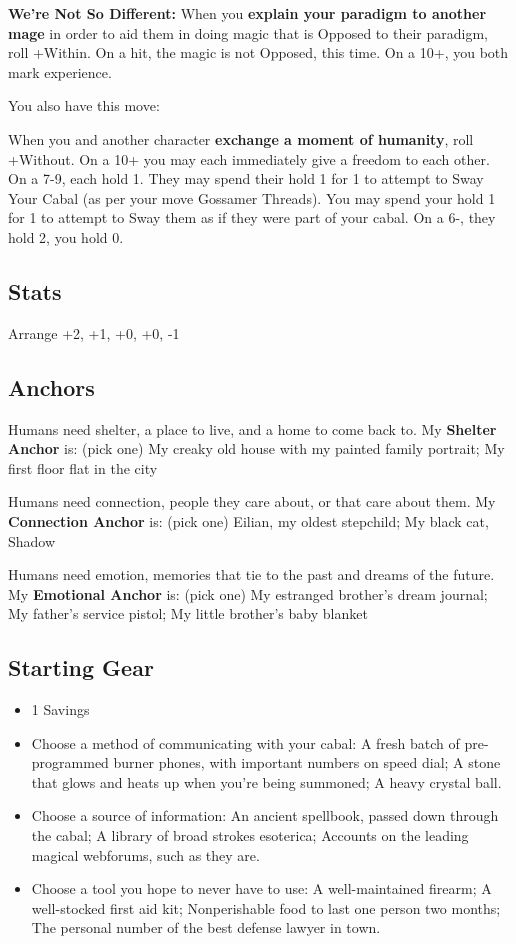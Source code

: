 \documentclass[
  oneside,
  statementpaper,
  9pt]{memoir}
\begin{document}
\textbf{We're Not So Different:} When you \textbf{explain your paradigm
to another mage} in order to aid them in doing magic that is Opposed to
their paradigm, roll +Within. On a hit, the magic is not Opposed, this
time. On a 10+, you both mark experience.

You also have this move:

When you and another character \textbf{exchange a moment of humanity},
roll +Without. On a 10+ you may each immediately give a freedom to each
other. On a 7-9, each hold 1. They may spend their hold 1 for 1 to
attempt to Sway Your Cabal (as per your move Gossamer Threads). You may
spend your hold 1 for 1 to attempt to Sway them as if they were part of
your cabal. On a 6-, they hold 2, you hold 0.

\hypertarget{stats-2}{%
\subsection{Stats}\label{stats-2}}

Arrange +2, +1, +0, +0, -1

\hypertarget{anchors-2}{%
\subsection{Anchors}\label{anchors-2}}

Humans need shelter, a place to live, and a home to come back to. My
\textbf{Shelter Anchor} is: (pick one) My creaky old house with my
painted family portrait; My first floor flat in the city

Humans need connection, people they care about, or that care about them.
My \textbf{Connection Anchor} is: (pick one) Eilian, my oldest
stepchild; My black cat, Shadow

Humans need emotion, memories that tie to the past and dreams of the
future. My \textbf{Emotional Anchor} is: (pick one) My estranged
brother's dream journal; My father's service pistol; My little brother's
baby blanket

\hypertarget{starting-gear}{%
\subsection{Starting Gear}\label{starting-gear}}

\begin{itemize}
\tightlist
\item
  1 Savings
\item
  Choose a method of communicating with your cabal: A fresh batch of
  pre-programmed burner phones, with important numbers on speed dial; A
  stone that glows and heats up when you're being summoned; A heavy
  crystal ball.
\item
  Choose a source of information: An ancient spellbook, passed down
  through the cabal; A library of broad strokes esoterica; Accounts on
  the leading magical webforums, such as they are.
\item
  Choose a tool you hope to never have to use: A well-maintained
  firearm; A well-stocked first aid kit; Nonperishable food to last one
  person two months; The personal number of the best defense lawyer in
  town.
\end{itemize}
\end{document}
